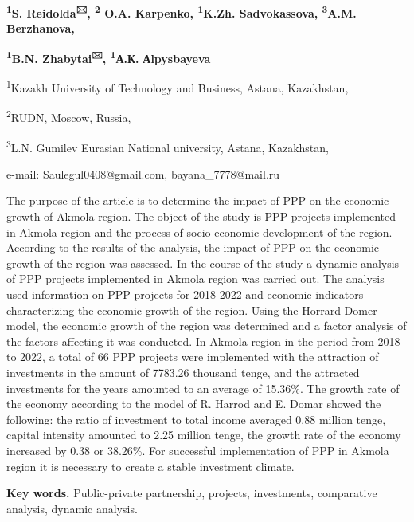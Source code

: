 \begin{center}
{\bfseries \textsuperscript{1}S. Reidolda\textsuperscript{🖂},
\textsuperscript{2} O.A. Karpenko, \textsuperscript{1}K.Zh.
Sadvokassova, \textsuperscript{3}A.M. Berzhanova,}

{\bfseries \textsuperscript{1}B.N. Zhabytai\textsuperscript{🖂},
\textsuperscript{1}А.К.} {\bfseries Аlpysbayeva}

\textsuperscript{1}Kazakh University of Technology and Business, Astana,
Kazakhstan,

\textsuperscript{2}RUDN, Moscow, Russia,

\textsuperscript{3}L.N. Gumilev Eurasian National university, Astana,
Kazakhstan,

e-mail: Saulegul0408@gmail.com, bayana\_7778@mail.ru
\end{center}

The purpose of the article is to determine the impact of PPP on the
economic growth of Akmola region. The object of the study is PPP
projects implemented in Akmola region and the process of socio-economic
development of the region. According to the results of the analysis, the
impact of PPP on the economic growth of the region was assessed. In the
course of the study a dynamic analysis of PPP projects implemented in
Akmola region was carried out. The analysis used information on PPP
projects for 2018-2022 and economic indicators characterizing the
economic growth of the region. Using the Horrard-Domer model, the
economic growth of the region was determined and a factor analysis of
the factors affecting it was conducted. In Akmola region in the period
from 2018 to 2022, a total of 66 PPP projects were implemented with the
attraction of investments in the amount of 7783.26 thousand tenge, and
the attracted investments for the years amounted to an average of
15.36\%. The growth rate of the economy according to the model of R.
Harrod and E. Domar showed the following: the ratio of investment to
total income averaged 0.88 million tenge, capital intensity amounted to
2.25 million tenge, the growth rate of the economy increased by 0.38 or
38.26\%. For successful implementation of PPP in Akmola region it is
necessary to create a stable investment climate.

{\bfseries Key words.} Public-private partnership, projects, investments,
comparative analysis, dynamic analysis.

